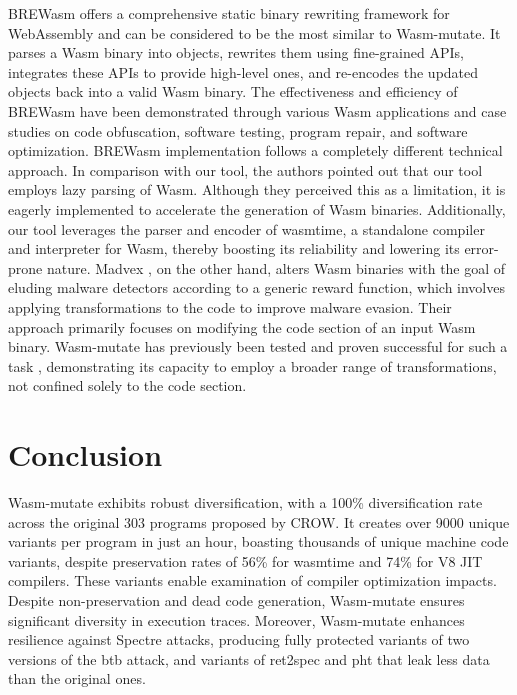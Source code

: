 \documentclass[sigplan,screen]{acmart}
\newcommand*\badge[1]{ \colorbox{red}{\color{white}#1}}
\newcommand{\tool}{Wasm-mutate\xspace}
\newcommand{\wasm}{Wasm\xspace}
\newcommand{\Wasm}{WebAssembly\xspace}
\newcommand{\todo}[1]{%
\refstepcounter{todo}
\noindent\textbf{\badge{TODO}} {\color{red}#1}
\addcontentsline{td}{todo}
{\color{red}\thesection.\thetodo\xspace #1}}
\begin{document}

BREWasm \cite{rewritingtool2023} offers a comprehensive static binary rewriting framework for \Wasm and can be considered to be the most similar to \tool. 
It parses a Wasm binary into objects, rewrites them using fine-grained APIs, integrates these APIs to provide high-level ones, and re-encodes the updated objects back into a valid Wasm binary. 
The effectiveness and efficiency of BREWasm have been demonstrated through various Wasm applications and case studies on code obfuscation, software testing, program repair, and software optimization. 
BREWasm implementation follows a completely different technical approach.
In comparison with our tool, the authors pointed out that our tool employs lazy parsing of Wasm. 
Although they perceived this as a limitation, it is eagerly implemented to accelerate the generation of \wasm binaries.
Additionally, our tool leverages the parser and encoder of wasmtime, a standalone compiler and interpreter for Wasm, thereby boosting its reliability and lowering its error-prone nature.
Madvex \cite{madvex}, on the other hand, alters Wasm binaries with the goal of eluding malware detectors according to a generic reward function, which involves applying transformations to the code to improve malware evasion. 
Their approach primarily focuses on modifying the code section of an input Wasm binary. 
\tool has previously been tested and proven successful for such a task \cite{CABRERAARTEAGA2023103296}, demonstrating its capacity to employ a broader range of transformations, not confined solely to the code section.





\section{Conclusion}
\label{conc}


\tool exhibits robust diversification, with a 100\% diversification rate across the original 303 programs proposed by CROW. 
It creates over 9000 unique variants per program in just an hour, boasting thousands of unique machine code variants, despite preservation rates of 56\% for wasmtime and 74\% for V8 JIT compilers. 
These variants enable examination of compiler optimization impacts.
Despite non-preservation and dead code generation, \tool ensures significant diversity in execution traces. 
Moreover, \tool enhances resilience against Spectre attacks, producing fully protected variants of two versions of the btb attack, and variants of ret2spec and pht that leak less data than the original ones.
\end{document}
